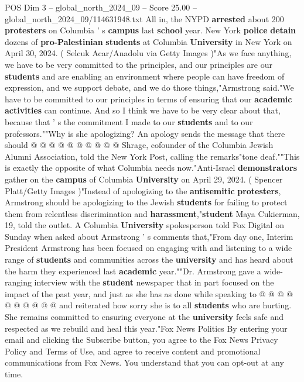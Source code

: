 \begin{textsample}{POS Dim 3 – global\_north\_2024\_09 – Score 25.00 – global\_north\_2024\_09/114631948.txt}
All in, the NYPD \textbf{arrested} about 200 \textbf{protesters} on Columbia ' s \textbf{campus} last \textbf{school} year.
New York \textbf{police} \textbf{detain} dozens of \textbf{pro-Palestinian} \textbf{students} at Columbia \textbf{University} in New York on April 30, 2024. ( Selcuk Acar/Anadolu via Getty Images )"As we face anything, we have to be very committed to the principles, and our principles are our \textbf{students} and are enabling an environment where people can have freedom of expression, and we support debate, and we do those things,"Armstrong said."We have to be committed to our principles in terms of ensuring that our \textbf{academic} \textbf{activities} can continue.
And so I think we have to be very clear about that, because that ' s the commitment I made to our \textbf{students} and to our professors.""Why is she apologizing?
An apology sends the message that there should @ @ @ @ @ @ @ @ @ @ Shrage, cofounder of the Columbia Jewish Alumni Association, told the New York Post, calling the remarks"tone deaf.""This is exactly the opposite of what Columbia needs now."Anti-Israel \textbf{demonstrators} gather on the \textbf{campus} of Columbia \textbf{University} on April 29, 2024. ( Spencer Platt/Getty Images )"Instead of apologizing to the \textbf{antisemitic} \textbf{protesters}, Armstrong should be apologizing to the Jewish \textbf{students} for failing to protect them from relentless discrimination and \textbf{harassment},"\textbf{student} Maya Cukierman, 19, told the outlet.
A Columbia \textbf{University} spokesperson told Fox Digital on Sunday when asked about Armstrong ' s comments that,"From day one, Interim President Armstrong has been focused on engaging with and listening to a wide range of \textbf{students} and communities across the \textbf{university} and has heard about the harm they experienced last \textbf{academic} year.""Dr.
Armstrong gave a wide-ranging interview with the \textbf{student} newspaper that in part focused on the impact of the past year, and just as she has as done while speaking to @ @ @ @ @ @ @ @ @ @ and reiterated how sorry she is to all \textbf{students} who are hurting.
She remains committed to ensuring everyone at the \textbf{university} feels safe and respected as we rebuild and heal this year."Fox News Politics By entering your email and clicking the Subscribe button, you agree to the Fox News Privacy Policy and Terms of Use, and agree to receive content and promotional communications from Fox News.
You understand that you can opt-out at any time.

\end{textsample}
